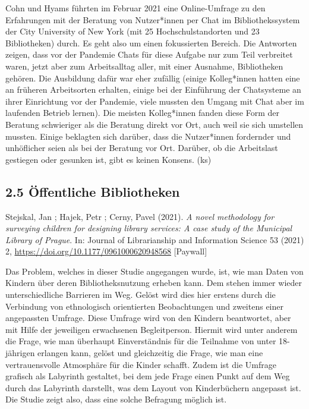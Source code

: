 \documentclass[a4paper,
fontsize=11pt,
oneside,
numbers=noperiodatend,
parskip=half-,
bibliography=totoc,
final
]{scrartcl}
\begin{document}
Cohn und Hyams führten im Februar 2021 eine Online-Umfrage zu den
Erfahrungen mit der Beratung von Nutzer*innen per Chat im
Bibliothekssystem der City University of New York (mit 25
Hochschulstandorten und 23 Bibliotheken) durch. Es geht also um einen
fokussierten Bereich. Die Antworten zeigen, dass vor der Pandemie Chats
für diese Aufgabe nur zum Teil verbreitet waren, jetzt aber zum
Arbeitsalltag aller, mit einer Ausnahme, Bibliotheken gehören. Die
Ausbildung dafür war eher zufällig (einige Kolleg*innen hatten eine an
früheren Arbeitsorten erhalten, einige bei der Einführung der
Chatsysteme an ihrer Einrichtung vor der Pandemie, viele mussten den
Umgang mit Chat aber im laufenden Betrieb lernen). Die meisten
Kolleg*innen fanden diese Form der Beratung schwieriger als die Beratung
direkt vor Ort, auch weil sie sich umstellen mussten. Einige beklagten
sich darüber, dass die Nutzer*innen fordernder und unhöflicher seien als
bei der Beratung vor Ort. Darüber, ob die Arbeitslast gestiegen oder
gesunken ist, gibt es keinen Konsens. (ks)

\hypertarget{uxf6ffentliche-bibliotheken}{%
\subsection{2.5 Öffentliche
Bibliotheken}\label{uxf6ffentliche-bibliotheken}}

Stejskal, Jan ; Hajek, Petr ; Cerny, Pavel (2021). \emph{A novel
methodology for surveying children for designing library services: A
case study of the Municipal Library of Prague}. In: Journal of
Librarianship and Information Science 53 (2021) 2,
\url{https://doi.org/10.1177/0961000620948568} {[}Paywall{]}

Das Problem, welches in dieser Studie angegangen wurde, ist, wie man
Daten von Kindern über deren Bibliotheksnutzung erheben kann. Dem stehen
immer wieder unterschiedliche Barrieren im Weg. Gelöst wird dies hier
erstens durch die Verbindung von ethnologisch orientierten Beobachtungen
und zweitens einer angepassten Umfrage. Diese Umfrage wird von den
Kindern beantwortet, aber mit Hilfe der jeweiligen erwachsenen
Begleitperson. Hiermit wird unter anderem die Frage, wie man überhaupt
Einverständnis für die Teilnahme von unter 18-jährigen erlangen kann,
gelöst und gleichzeitig die Frage, wie man eine vertrauensvolle
Atmosphäre für die Kinder schafft. Zudem ist die Umfrage grafisch als
Labyrinth gestaltet, bei dem jede Frage einen Punkt auf dem Weg durch
das Labyrinth darstellt, was dem Layout von Kinderbüchern angepasst ist.
Die Studie zeigt also, dass eine solche Befragung möglich ist.
\end{document}
